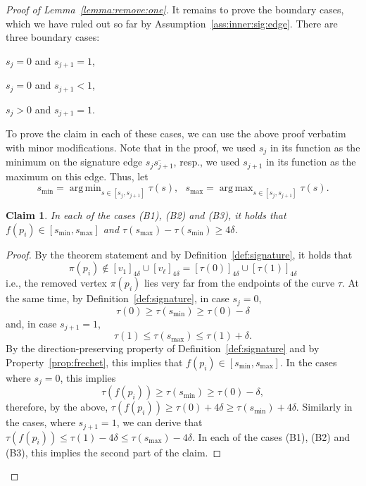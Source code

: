 \documentclass[11pt, letter]{article}
\DeclareMathOperator*{\argmin}{arg\,min}
\DeclareMathOperator*{\argmax}{arg\,max}
\newtheorem{claim}[theorem]{Claim}
\newcommand{\lemref}[1]{Lemma~\ref{lemma:#1}}
\newcommand{\defref}[1]{Definition~\ref{def:#1}}
\newcommand{\claimlab}[1]{\label{claim:#1}}
\newcommand{\assref}[1]{Assumption~\ref{ass:#1}}
\newcommand{\propref}[1]{Property~\ref{prop:#1}}
\newcommand{\range}[2]{\ensuremath{[#1]_{#2}}}
\begin{document}
\begin{proof}[Proof of \lemref{remove:one}]
It remains to prove the boundary cases, which we have ruled out so far by
\assref{inner:sig:edge}. There are three boundary cases:
\begin{compactenum}[(B1)]
\item $s_j=0$ and $s_{j+1}=1$,
\item $s_j=0$ and $s_{j+1}<1$,
\item $s_j>0$ and $s_{j+1}=1$.
\end{compactenum}

To prove the claim in each of these cases, we can use the above proof verbatim
with minor modifications.  Note that in the proof, we used $s_j$ in its function
as the minimum on the signature edge $\overline{s_js_{j+1}}$, resp., we used
$s_{j+1}$ in its function as the maximum
on this edge.  Thus, let
 \[s_{\min}=\argmin_{s \in [s_j,s_{j+1}]} \tau(s), ~~~ s_{\max}=\argmax_{s \in [s_{j},s_{j+1}]} \tau(s). \]

\begin{claim}
In each of the cases (B1), (B2) and (B3), it holds that
$f(p_i) \in [s_{\min},s_{\max}]$ and $\tau(s_{\max})-\tau(s_{\min}) \geq
4\delta$.
\claimlab{pi:inside}
\end{claim}
\begin{proof}
By the theorem statement and by \defref{signature}, it holds that
\[ \pi(p_i) \notin \range{v_1}{4\delta} \cup \range{v_{\ell}}{4\delta} 
= \range{\tau(0)}{4\delta} \cup \range{\tau(1)}{4\delta}\]
i.e., the removed vertex $\pi(p_i)$ lies very far from the endpoints of
the curve $\tau$. At the same time, by \defref{signature},
in case $s_j=0$,
\[\tau(0) \geq \tau(s_{\min}) \geq \tau(0) - \delta\] 
and, in case $s_{j+1}=1$,
\[\tau(1) \leq \tau(s_{\max}) \leq \tau(1) + \delta.\]
By the direction-preserving property of \defref{signature} and by
\propref{frechet}, this implies that $f(p_i) \in [s_{\min},s_{\max}]$.
In the cases where $s_j=0$, this implies
 \[\tau(f(p_i)) \geq \tau(s_{\min}) \geq \tau(0) - \delta, \]
therefore, by the above, $\tau(f(p_i)) \geq \tau(0) + 4\delta \geq
\tau(s_{\min})+4\delta$.
Similarly in the cases, where $s_{j+1}=1$, 
we can derive that $\tau(f(p_i)) \leq \tau(1) - 4\delta \leq \tau(s_{\max})-4\delta$.
In each of the cases (B1), (B2) and (B3), this implies the second part of the claim.
\end{proof}


\end{proof}
\end{document}
